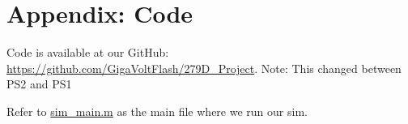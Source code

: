 \appendix
\section{Appendix: Code}


Code is available at our GitHub: \href{https://github.com/GigaVoltFlash/279D_Project}{https://github.com/GigaVoltFlash/279D\_Project}. Note: This changed between PS2 and PS1

Refer to \href{https://github.com/GigaVoltFlash/279D_Project/blob/main/sim/sim_main.m}{sim\_main.m} as the main file where we run our sim.
